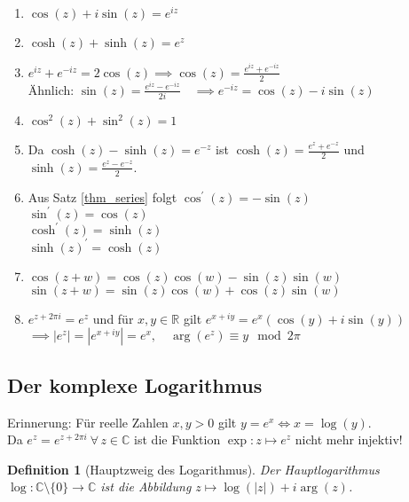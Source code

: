 \documentclass[a4paper,12pt]{article}
\theoremstyle{newthm}
\theoremstyle{newdef}
\newtheorem{defn}[thm]{Definition}
\theoremstyle{newrem}
\newcommand{\R}{\mathbb{R}}
\newcommand{\C}{\mathbb{C}}
\begin{document}
		\begin{enumerate}[label={\alph*})]
			\item $ \cos(z) + i\sin(z) = e^{iz} $
			\item $ \cosh(z) + \sinh(z) = e^z $
			\item $ e^{iz} + e^{-iz} = 2 \cos(z) \implies \cos(z) = \frac{e^{iz} + e^{-iz}}{2} $\\
			Ähnlich: $ \sin(z) = \frac{e^{iz} - e^{-iz}}{2i} \quad \implies e^{-iz} = \cos(z) -i\sin(z) $
			\item $ \cos^2(z) + \sin^2(z) = 1 $
			\item Da $ \cosh(z) - \sinh(z) = e^{-z} $ ist $ \cosh(z) = \frac{e^{z} + e^{-z}}{2} $ und $ \sinh(z) = \frac{e^{z} - e^{-z}}{2} $.
			\item Aus Satz \ref{thm_series} folgt $ \cos^\prime(z) = -\sin(z) $\\
			$ \sin^\prime(z) = \cos(z) $\\
			$ \cosh^\prime(z) = \sinh(z) $\\
			$ \sinh(z)^\prime = \cosh(z) $
			\item $ \cos(z+w) = \cos(z)\cos(w) - \sin(z)\sin(w) $\\
			$ \sin(z+w) = \sin(z)\cos(w) + \cos(z)\sin(w) $
			\item $ e^{z+2\pi i} = e^z $ und für $ x,y \in \R $ gilt $ e^{x+iy} = e^x(\cos(y)+i\sin(y)) $\\
			$ \implies |e^z| = |e^{x+iy}| = e^x, \quad \arg(e^z) \equiv y \mod 2\pi $
		\end{enumerate}
	
	
	
	\subsection{Der komplexe Logarithmus}
		
		Erinnerung: Für reelle Zahlen $ x,y > 0 $ gilt $ y = e^x \iff x = \log(y) $.\\
		Da $ e^z = e^{z+2\pi i} \ \forall\, z \in \C $ ist die Funktion $ \exp: z \mapsto e^z $ nicht mehr injektiv!
		
		\begin{defn}[Hauptzweig des Logarithmus]
			Der \emph{Hauptlogarithmus} $ \log: \C \setminus \{0\} \to \C $ ist die Abbildung $ z \mapsto \log(|z|) + i \arg(z) $.
		\end{defn}
		
\end{document}
